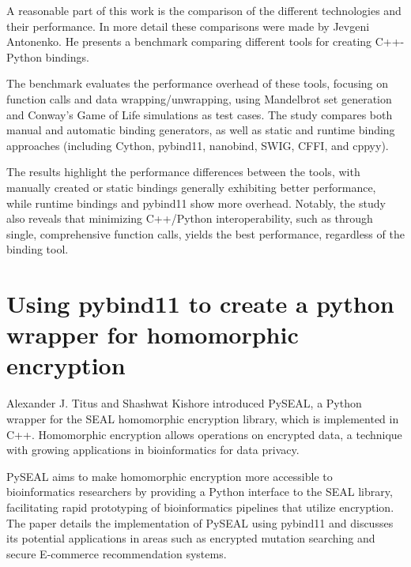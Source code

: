 A reasonable part of this work is the comparison of the different technologies and their performance. In more detail these comparisons were made by Jevgeni Antonenko. He presents a benchmark comparing different tools for creating C++-Python bindings. 

The benchmark evaluates the performance overhead of these tools, focusing on function calls and data wrapping/unwrapping, using Mandelbrot set generation and Conway's Game of Life simulations as test cases. The study compares both manual and automatic binding generators, as well as static and runtime binding approaches (including Cython, pybind11, nanobind, SWIG, CFFI, and cppyy). 

The results highlight the performance differences between the tools, with manually created or static bindings generally exhibiting better performance, while runtime bindings and pybind11 show more overhead. Notably, the study also reveals that minimizing C++/Python interoperability, such as through single, comprehensive function calls, yields the best performance, regardless of the binding tool. \cite{rw-benchmarks}

\section{Using pybind11 to create a python wrapper for homomorphic encryption}

Alexander J. Titus and Shashwat Kishore introduced PySEAL, a Python wrapper for the SEAL homomorphic encryption library, which is implemented in C++. Homomorphic encryption allows operations on encrypted data, a technique with growing applications in bioinformatics for data privacy. 

PySEAL aims to make homomorphic encryption more accessible to bioinformatics researchers by providing a Python interface to the SEAL library, facilitating rapid prototyping of bioinformatics pipelines that utilize encryption. The paper details the implementation of PySEAL using pybind11 and discusses its potential applications in areas such as encrypted mutation searching and secure E-commerce recommendation systems. \cite{rw-pyseal}